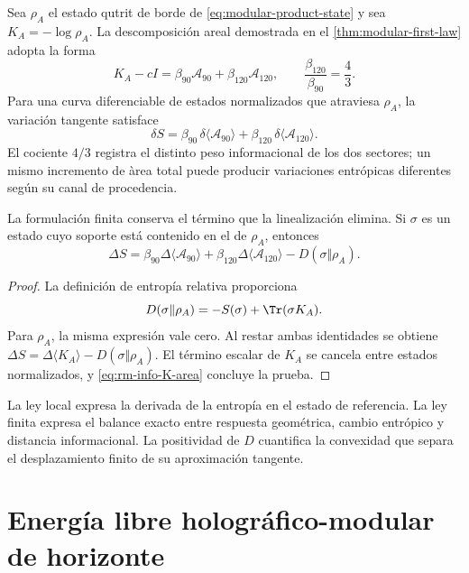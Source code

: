 Sea \(\rho_A\) el estado qutrit de borde de
\cref{eq:modular-product-state} y sea
\(K_A=-\log\rho_A\). La descomposici\'on areal demostrada en el
\cref{thm:modular-first-law} adopta la forma
\begin{equation}
 K_A-cI
 =\beta_{90}\mathcal A_{90}
 +\beta_{120}\mathcal A_{120},
 \qquad
 \frac{\beta_{120}}{\beta_{90}}=\frac43.
 \label{eq:rm-info-K-area}
\end{equation}
Para una curva diferenciable de estados normalizados que atraviesa
\(\rho_A\), la variaci\'on tangente satisface
\begin{equation}
 \boxed{
 \delta S
 =\beta_{90}\,\delta\langle\mathcal A_{90}\rangle
 +\beta_{120}\,\delta\langle\mathcal A_{120}\rangle.}
 \label{eq:rm-info-first-law}
\end{equation}
El cociente \(4/3\) registra el distinto peso informacional de los dos
sectores; un mismo incremento de \`area total puede producir variaciones
entr\'opicas diferentes seg\'un su canal de procedencia.

La formulaci\'on finita conserva el t\'ermino que la linealizaci\'on elimina.
Si \(\sigma\) es un estado cuyo soporte est\'a contenido en el de
\(\rho_A\), entonces
\begin{equation}
 \boxed{
 \Delta S
 =\beta_{90}\Delta\langle\mathcal A_{90}\rangle
 +\beta_{120}\Delta\langle\mathcal A_{120}\rangle
 -D(\sigma\Vert\rho_A).}
 \label{eq:rm-info-finite-law}
\end{equation}

\begin{proof}
La definici\'on de entrop\'ia relativa proporciona
\[
 D(\sigma\Vert\rho_A)
 =-S(\sigma)+\Tr(\sigma K_A).
\]
Para \(\rho_A\), la misma expresi\'on vale cero. Al restar ambas
identidades se obtiene
\(\Delta S=\Delta\langle K_A\rangle-D(\sigma\Vert\rho_A)\).
El t\'ermino escalar de \(K_A\) se cancela entre estados normalizados, y
\cref{eq:rm-info-K-area} concluye la prueba.
\end{proof}

La ley local expresa la derivada de la entrop\'ia en el estado de
referencia. La ley finita expresa el balance exacto entre respuesta
geom\'etrica, cambio entr\'opico y distancia informacional. La positividad de
\(D\) cuantifica la convexidad que separa el desplazamiento finito de su
aproximaci\'on tangente.

\section{Energ\'ia libre hologr\'afico-modular de horizonte}

